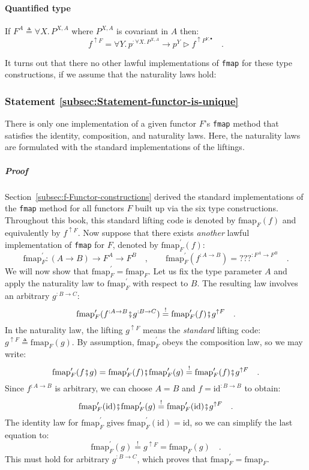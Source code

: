\paragraph{Quantified type}

If $F^{A}\triangleq\forall X.\,P^{X,A}$ where $P^{X,A}$ is covariant
in $A$ then: 
\[
f^{\uparrow F}=\forall Y.\,p^{:\forall X.\,P^{X,A}}\rightarrow p^{Y}\triangleright f^{\uparrow P^{Y,\bullet}}\quad.
\]

It turns out that there no other lawful implementations of \lstinline!fmap!
for these type constructions, if we assume that the naturality laws
hold:

\subsubsection{Statement \label{subsec:Statement-functor-is-unique}\ref{subsec:Statement-functor-is-unique}}

There is only one implementation of a given functor $F$\textsf{'}s \lstinline!fmap!
method that satisfies the identity, composition, and naturality laws.
Here, the naturality laws are formulated with the standard implementations
of the liftings.

\subparagraph{Proof}

Section~\ref{subsec:f-Functor-constructions} derived the standard
implementations of the \lstinline!fmap! method for all functors $F$
built up via the six type constructions. Throughout this book, this
standard lifting code is denoted by $\text{fmap}_{F}(f)$ and equivalently
by $f^{\uparrow F}$. Now suppose that there exists \emph{another}
lawful implementation of \lstinline!fmap! for $F$, denoted by $\text{fmap}_{F}^{\prime}(f)$:
\[
\text{fmap}_{F}^{\prime}:\left(A\rightarrow B\right)\rightarrow F^{A}\rightarrow F^{B}\quad,\quad\quad\text{fmap}_{F}^{\prime}(f^{:A\rightarrow B})=\text{???}^{:F^{A}\rightarrow F^{B}}\quad.
\]
We will now show that $\text{fmap}_{F}^{\prime}=\text{fmap}_{F}$.
Let us fix the type parameter $A$ and apply the naturality law to
$\text{fmap}_{F}^{\prime}$ with respect to $B$. The resulting law
involves an arbitrary $g^{:B\rightarrow C}$:
\[
\text{fmap}_{F}^{\prime}(f^{:A\rightarrow B}\bef g^{:B\rightarrow C})\overset{!}{=}\text{fmap}_{F}^{\prime}(f)\bef g^{\uparrow F}\quad.
\]
In the naturality law, the lifting $g^{\uparrow F}$ means the \emph{standard}
lifting code: $g^{\uparrow F}\triangleq\text{fmap}_{F}(g)$. By assumption,
$\text{fmap}_{F}^{\prime}$ obeys the composition law, so we may write:
\[
\text{fmap}_{F}^{\prime}(f\bef g)=\text{fmap}_{F}^{\prime}(f)\bef\text{fmap}_{F}^{\prime}(g)\overset{!}{=}\text{fmap}_{F}^{\prime}(f)\bef g^{\uparrow F}\quad.
\]
Since $f^{:A\rightarrow B}$ is arbitrary, we can choose $A=B$ and
$f=\text{id}^{:B\rightarrow B}$ to obtain:
\[
\text{fmap}_{F}^{\prime}(\text{id})\bef\text{fmap}_{F}^{\prime}(g)\overset{!}{=}\text{fmap}_{F}^{\prime}(\text{id})\bef g^{\uparrow F}\quad.
\]
The identity law for $\text{fmap}_{F}^{\prime}$ gives $\text{fmap}_{F}^{\prime}(\text{id})=\text{id}$,
so we can simplify the last equation to:
\[
\text{fmap}_{F}^{\prime}(g)\overset{!}{=}g^{\uparrow F}=\text{fmap}_{F}(g)\quad.
\]
This must hold for arbitrary $g^{:B\rightarrow C}$, which proves
that $\text{fmap}_{F}^{\prime}=\text{fmap}_{F}$.

